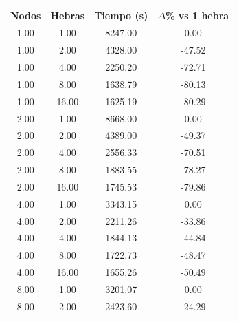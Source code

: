 \begin{table}[ht]
    \centering
    \begin{tabular}{|c|c|c|c|}
        \hline
        \textbf{Nodos} & \textbf{Hebras} & \textbf{Tiempo (s)} & \textbf{$\Delta$\% vs 1 hebra} \\
        \hline
        1.00           & 1.00            & 8247.00             & 0.00                           \\
        1.00           & 2.00            & 4328.00             & -47.52                         \\
        1.00           & 4.00            & 2250.20             & -72.71                         \\
        1.00           & 8.00            & 1638.79             & -80.13                         \\
        1.00           & 16.00           & 1625.19             & -80.29                         \\
        2.00           & 1.00            & 8668.00             & 0.00                           \\
        2.00           & 2.00            & 4389.00             & -49.37                         \\
        2.00           & 4.00            & 2556.33             & -70.51                         \\
        2.00           & 8.00            & 1883.55             & -78.27                         \\
        2.00           & 16.00           & 1745.53             & -79.86                         \\
        4.00           & 1.00            & 3343.15             & 0.00                           \\
        4.00           & 2.00            & 2211.26             & -33.86                         \\
        4.00           & 4.00            & 1844.13             & -44.84                         \\
        4.00           & 8.00            & 1722.73             & -48.47                         \\
        4.00           & 16.00           & 1655.26             & -50.49                         \\
        8.00           & 1.00            & 3201.07             & 0.00                           \\
        8.00           & 2.00            & 2423.60             & -24.29                         \\

\end{tabular}
\end{table}
